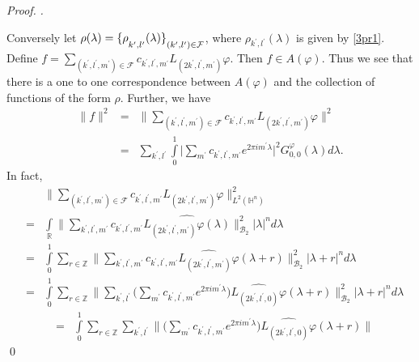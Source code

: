 \documentclass[a4paper,12pt,reqno]{amsart}
\theoremstyle{plain}
\numberwithin{equation}{section}
\theoremstyle{definition}
\newenvironment{pf}[1][]{%
 \vskip 3mm
 \noindent
 \ifthenelse{\equal{#1}{}}%
  {{\slshape Proof. }}%
  {{\slshape #1.} }%
 }%
{\qed\bigskip}
\begin{document}
\begin{pf}
Conversely let $\rho(\lambda)=\fontdimen16\textfont2=5pt \{\rho_{k^{\prime},l^{\prime}}(\lambda)\}_
{(k^{\prime},l^{\prime})\in\mathcal{F}}$, where $\rho_{k^{\prime},l^{\prime}}(\lambda)$ is given by \eqref{3pr1}. Define $f=\sum\limits_{(k^{\prime},l^{\prime},m^{\prime})\in\mathcal{F}}
c_{k^{\prime},l^{\prime},m^{\prime}}L_{(2k^{\prime},l^{\prime},m^{\prime})}\varphi$. Then $f\in A(\varphi)$. Thus we see that there is a one to one correspondence between $A(\varphi)$ and the collection of functions of the form $\rho$. Further, we have
\begin{eqnarray}
\|f\|^{2}&=&\bigg\|\sum\limits_{(k^{\prime},l^{\prime},m^{\prime})\in\mathcal{F}}
c_{k^{\prime},l^{\prime},m^{\prime}}L_{(2k^{\prime},l^{\prime},m^{\prime})}\varphi\bigg\|^{2}\nonumber\\
&=&\sum\limits_{k^{\prime},l^{\prime}}\int\limits_{0}^{1}\bigg|\sum\limits_{m^{\prime}}c_{k^{\prime},l^{\prime},m^{\prime}}e^{2\pi im^{\prime}\lambda}\bigg|^{2}G_{0,0}^{\varphi}(\lambda)d\lambda.\label{3peq14}
\end{eqnarray}
In fact,
\begin{eqnarray}
&&\bigg\|\sum\limits_{(k^{\prime},l^{\prime},m^{\prime})\in\mathcal{F}} c_{k^{\prime},l^{\prime},m^{\prime}}L_{(2k^{\prime},l^{\prime},m^{\prime})}\varphi\bigg\|_{L^{2}(\mathbb{H}^{n})}^{2}\nonumber\\
&=&\int\limits_{\mathbb{R}}\bigg\|\sum\limits_{k^{\prime},l^{\prime},m^{\prime}}c_{k^{\prime},l^{\prime},m^{\prime}}
\widehat{L_{(2k^{\prime},l^{\prime},m^{\prime})}\varphi(\lambda)}\bigg\|_{\mathcal{B}_{2}}^{2}
|\lambda|^{n}d\lambda\nonumber\\
&=&\int\limits_{0}^{1}\sum\limits_{r\in\mathbb{Z}}\bigg\|\sum\limits_{k^{\prime},l^{\prime},m^{\prime}}
c_{k^{\prime},l^{\prime},m^{\prime}}\widehat{L_{(2k^{\prime},l^{\prime},m^{\prime})}\varphi}(\lambda+r)\bigg\|
_{\mathcal{B}_{2}}^{2}|\lambda+r|^{n}d\lambda\nonumber\\
&=&\int\limits_{0}^{1}\sum\limits_{r\in\mathbb{Z}}\bigg\|\sum\limits_{k^{\prime},l^{\prime}}
\bigg(\sum\limits_{m^{\prime}}c_{k^{\prime},l^{\prime},m^{\prime}} e^{2\pi im^{\prime}\lambda}\bigg)\widehat{L_{(2k^{\prime},l^{\prime},0)}\varphi}(\lambda+r)\bigg\|
_{\mathcal{B}_{2}}^{2}|\lambda+r|^{n}d\lambda\nonumber
\end{eqnarray}
\begin{eqnarray}
&=&\int\limits_{0}^{1}\sum\limits_{r\in\mathbb{Z}}\sum\limits_{k^{\prime},l^{\prime}}\bigg\|
\bigg(\sum\limits_{m^{\prime}}c_{k^{\prime},l^{\prime},m^{\prime}} e^{2\pi im^{\prime}\lambda}\bigg)\widehat{L_{(2k^{\prime},l^{\prime},0)}\varphi}(\lambda+r)\bigg\|

\end{eqnarray}
\end{pf}
\end{document}
